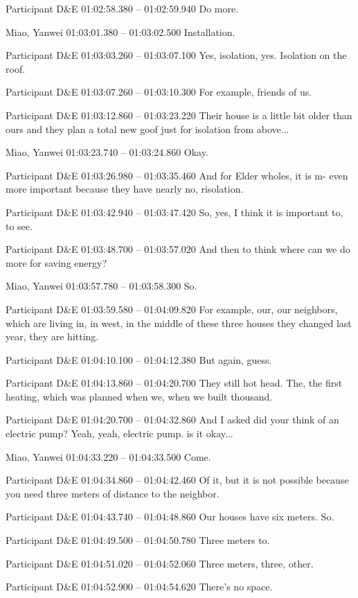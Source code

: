 {Participant D\&E 01:02:58.380 -- 01:02:59.940
Do more.

Miao, Yanwei 01:03:01.380 -- 01:03:02.500
Installation.

Participant D\&E 01:03:03.260 -- 01:03:07.100
Yes, isolation, yes. Isolation on the roof.

Participant D\&E 01:03:07.260 -- 01:03:10.300
For example, friends of us.

Participant D\&E 01:03:12.860 -- 01:03:23.220
Their house is a little bit older than ours and they plan a total new goof just for isolation from above...

Miao, Yanwei 01:03:23.740 -- 01:03:24.860
Okay.

Participant D\&E 01:03:26.980 -- 01:03:35.460
And for Elder wholes, it is m- even more important because they have nearly no, risolation.

Participant D\&E 01:03:42.940 -- 01:03:47.420
So, yes, I think it is important to, to see.

Participant D\&E 01:03:48.700 -- 01:03:57.020
And then to think where can we do more for saving energy?

Miao, Yanwei 01:03:57.780 -- 01:03:58.300
So.

Participant D\&E 01:03:59.580 -- 01:04:09.820
For example, our, our neighbors, which are living in, in west, in the middle of these three houses they changed last year, they are hitting.

Participant D\&E 01:04:10.100 -- 01:04:12.380
But again, guess.

Participant D\&E 01:04:13.860 -- 01:04:20.700
They still hot head. The, the first heating, which was planned when we, when we built thousand.

Participant D\&E 01:04:20.700 -- 01:04:32.860
And I asked did your think of an electric pump? Yeah, yeah, electric pump. is it okay...

Miao, Yanwei 01:04:33.220 -- 01:04:33.500
Come.

Participant D\&E 01:04:34.860 -- 01:04:42.460
Of it, but it is not possible because you need three meters of distance to the neighbor.

Participant D\&E 01:04:43.740 -- 01:04:48.860
Our houses have six meters. So.

Participant D\&E 01:04:49.500 -- 01:04:50.780
Three meters to.

Participant D\&E 01:04:51.020 -- 01:04:52.060
Three meters, three, other.

Participant D\&E 01:04:52.900 -- 01:04:54.620
There's no space.

}
